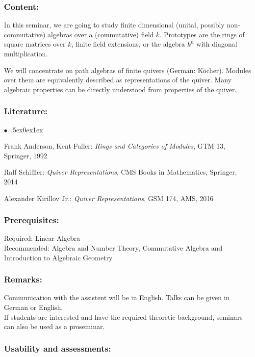 \documentclass[a4paper,10pt]{article}
\renewenvironment{itemize}{\begin{list}{$\bullet$\ }{\itemsep.5ex\setlength{\topsep}{0.5\itemsep}\parsep0ex\labelsep1ex\settowidth{\labelwidth}{$\bullet$\ }\setlength{\leftmargin}{\labelwidth}\addtolength{\leftmargin}{3ex}\addtolength{\leftmargin}{\labelsep}}}{\end{list}}
\begin{document}
\subsubsection*{\large
    Content:
}
In this seminar, we are going to study finite dimensional (unital, possibly non-commutative) algebras over a (commutative) field $k$. Prototypes are the rings of square matrices over $k$, finite field extensions, or the algebra $k^n$ with diagonal multiplication. 

We will concentrate on path algebras of finite quivers (German: Köcher). Modules over them are equivalently described as representations of the quiver. Many algebraic properties can be directly understood from properties of the quiver. 
\subsubsection*{\large
    Literature:
}
\begin{itemize}
\item
Frank Anderson, Kent Fuller: \emph{Rings and Categories of Modules}, GTM 13, Springer, 1992 
\item
Ralf Schiffler: \emph{Quiver Representations}, CMS Books in Mathematics, Springer, 2014 
\item
Alexander Kirillov Jr.: \emph{Quiver Representations}, GSM 174, AMS, 2016
\end{itemize}
\subsubsection*{\large
    Prerequisites:
}
Required: Linear Algebra \\ Recommended: Algebra and Number Theory, Commutative Algebra and Introduction to Algebraic Geometry
\subsubsection*{\large
    Remarks:
}
Communication with the assistent will be in English. Talks can be given in German or English.\\
If students are interested and have the required theoretic background, seminars can also be used as a proseminar. \\
\cleardoublepage
\subsubsection*{\large
    Usability and assessments:
}
\end{document}
